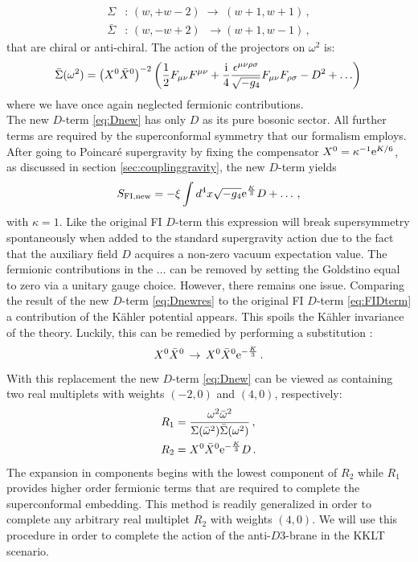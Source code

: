 \documentclass[a4paper,12pt,twoside,openright]{report}
\newcommand{\be}{\begin{equation}}
\newcommand{\ee}{\end{equation}}
\newcommand{\bea}{\begin{equation}\begin{aligned}}
\newcommand{\eea}{\end{aligned}\end{equation}}
\def\rmi{{\rm i}}
\def\rme{{\rm e}}
\begin{document}
\bea 
\Sigma&:\,(w,+w-2)\; \to \;(w+1,w+1)\,,\\
\bar{\Sigma}&:\,(w,-w+2)\; \;\to (w+1,w-1)\,,
\eea
that are chiral or anti-chiral. The action of the projectors on $\omega^2$ is:
\be 
\bar{\Sigma}(\omega^2)=\left(X^0\bar{X}^0\right)^{-2} \left(\frac{1}{2}F_{\mu\nu}F^{\mu\nu}+\frac{\rmi}{4}\frac{\epsilon^{\mu\nu\rho\sigma}}{\sqrt{-g_4}}F_{\mu\nu}F_{\rho\sigma}-D^2 + \ldots\right)\,
\ee
where we have once again neglected fermionic contributions.\\
The new $D$-term \eqref{eq:Dnew} has only $D$ as its pure bosonic sector. All further terms are required by the superconformal symmetry that our formalism employs. After going to Poincar\'{e} supergravity by fixing the compensator $X^0 = \kappa^{-1} \rme^{K/6}$, as discussed in section \ref{sec:couplinggravity}, the new $D$-term yields
\be 
S_{\text{FI,new}} = -\xi \int d^4x \sqrt{-g_4} \rme^{\frac{K}{3}}D + \ldots\,,
\label{eq:Dnewres}
\ee
with $\kappa = 1$. Like the original FI $D$-term this expression will break supersymmetry spontaneously when added to the standard supergravity action due to the fact that the auxiliary field $D$ acquires a non-zero vacuum expectation value. The fermionic contributions in the $\ldots$ can be removed by setting the Goldstino equal to zero via a unitary gauge choice. However, there remains one issue. Comparing the result of the new $D$-term \eqref{eq:Dnewres} to the original FI $D$-term \eqref{eq:FIDterm} a contribution of the Kähler potential appears. This spoils the Kähler invariance of the theory. Luckily, this can be remedied by performing a substitution \cite{Antoniadis:2018oeh}:
\be 
X^0 \bar{X}^0 \,\to\,X^0\bar{X}^0 \rme^{-\frac{K}{3}}\,.
\ee
With this replacement the new $D$-term \eqref{eq:Dnew} can be viewed as containing two real multiplets with weights $(-2,0)$ and $(4,0)$, respectively:
\bea 
R_1 &=\frac{\omega^2\bar{\omega}^2}{\Sigma(\bar{\omega}^2)\bar{\Sigma}(\omega^2)}\,,\\
R_2 &= X^0\bar{X}^0 \rme^{-\frac{K}{3}}D\,.
\eea
The expansion in components begins with the lowest component of $R_2$ while $R_1$ provides higher order fermionic terms that are required to complete the superconformal embedding. This method is readily generalized in order to complete any arbitrary real multiplet $R_2$ with weights $(4,0)$. We will use this procedure in order to complete the action of the anti-$D3$-brane in the KKLT scenario.
\end{document}
